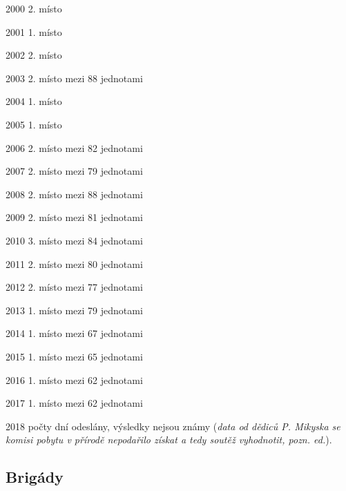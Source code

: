 2000 2. místo

2001 1. místo

2002 2. místo

2003 2. místo mezi 88 jednotami

2004 1. místo

2005 1. místo

2006 2. místo mezi 82 jednotami

2007 2. místo mezi 79 jednotami

2008 2. místo mezi 88 jednotami

2009 2. místo mezi 81 jednotami

2010 3. místo mezi 84 jednotami

2011 2. místo mezi 80 jednotami

2012 2. místo mezi 77 jednotami

2013 1. místo mezi 79 jednotami

2014 1. místo mezi 67 jednotami

2015 1. místo mezi 65 jednotami

2016 1. místo mezi 62 jednotami

2017 1. místo mezi 62 jednotami

2018 počty dní odeslány, výsledky nejsou známy (\emph{data od dědiců P.
Mikyska se komisi pobytu v přírodě nepodařilo získat a tedy soutěž
vyhodnotit, pozn. ed.}).

\subsection{Brigády}\label{briguxe1dy}


